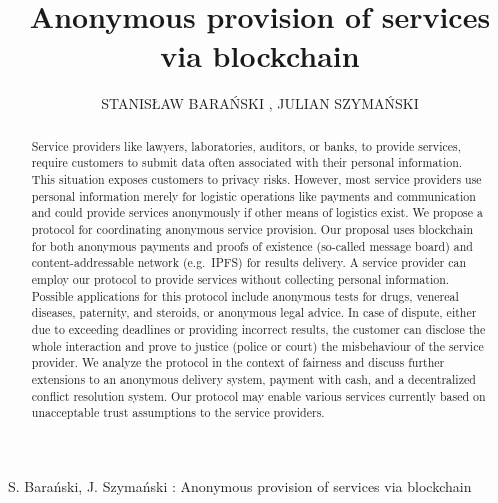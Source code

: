 \documentclass{ieeeaccess}
\begin{document}

\title{Anonymous provision of services via blockchain}
\author{\uppercase{Stanis\l{}aw Bara{\'n}ski} ,
\uppercase{Julian Szyma{\'n}ski } 
 }

\address[1]{Department of Electronic, Telecommunication and Informatics, Gdansk University of Technology, Narutowicza 11/12 Gdansk Poland (e-mail: stanislaw.baranski@pg.edu.pl, julian.szymanski@eti.pg.edu.pl}

 


{S. Bara{\'n}ski, J. Szyma{\'n}ski : 
Anonymous provision of services via blockchain}


\begin{abstract}
Service providers like lawyers, laboratories, auditors, or banks, to provide services, require customers to submit data often associated with their personal information. This situation exposes customers to privacy risks. However, most service providers use personal information merely for logistic operations like payments and communication and could provide services anonymously if other means of logistics exist.
We propose a protocol for coordinating anonymous service provision. Our proposal uses blockchain for both anonymous payments and proofs of existence (so-called message board) and content-addressable network (e.g.~IPFS) for results delivery.
A service provider can employ our protocol to provide services without collecting personal information. Possible applications for this protocol include anonymous tests for drugs, venereal diseases, paternity, and steroids, or anonymous legal advice.
In case of dispute, either due to exceeding deadlines or providing incorrect results, the customer can disclose the whole interaction and prove to justice (police or court) the misbehaviour of the service provider.
We analyze the protocol in the context of fairness and discuss further extensions to an anonymous delivery system, payment with cash, and a decentralized conflict resolution system.
Our protocol may enable various services currently based on unacceptable trust assumptions to the service providers.
\end{abstract}
\end{document}
